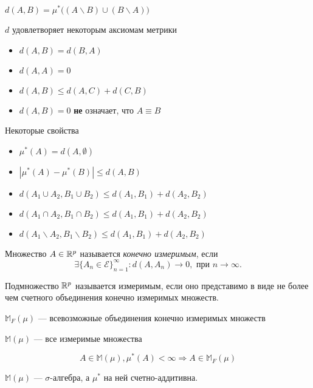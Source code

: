 \begin{definition}
  $d(A, B) = \mu^*\big((A\backslash B) \cup (B \backslash A)\big)$
\end{definition}

$d$ удовлетворяет некоторым аксиомам метрики

\begin{itemize}
  \item $d(A, B) = d(B, A)$
  \item $d(A, A) = 0$
  \item $d(A, B) \leq d(A, C) + d(C, B)$
  \item $d(A, B) = 0$ \textbf{не} означает, что $A \equiv B$
\end{itemize}

Некоторые свойства

\begin{itemize}
  \item $\mu^*(A) = d(A, \emptyset)$
  \item $|\mu^*(A) - \mu^*(B)| \leq d(A, B)$
  \item $d(A_1 \cup A_2, B_1 \cup B_2) \leq d(A_1, B_1) + d(A_2, B_2)$
  \item $d(A_1 \cap A_2, B_1 \cap B_2) \leq d(A_1, B_1) + d(A_2, B_2)$
  \item $d(A_1 \backslash A_2, B_1 \backslash B_2) \leq d(A_1, B_1) + d(A_2, B_2)$
\end{itemize}

\begin{definition}
  Множество $A \in \mathbb{R}^p$ называется \textit{конечно измеримым}, если $$\exists \{A_n \in \mathcal{E}\}_{n = 1}^{\infty}: d(A, A_n) \to 0, \text{ при } n \to \infty.$$
\end{definition}
\begin{definition}
  Подмножество $\mathbb{R}^p$ называется измеримым, если оно представимо в виде не более чем счетного объединения конечно измеримых множеств.
\end{definition}

$\mathbb{M}_F(\mu)$ --- всевозможные объединения конечно измеримых множеств

$\mathbb{M}(\mu)$ --- все измеримые множества

\begin{lemma}
  \hypertarget{Lemma1}{}
  $$A \in \mathbb{M}(\mu), \mu^*(A) < \infty  \Rightarrow A \in \mathbb{M}_F(\mu)$$
\end{lemma}

\begin{theorem}[Каратеодори]
  $\mathbb{M}(\mu)$ --- $\sigma$-алгебра, а $\mu^*$ на ней счетно-аддитивна.
\end{theorem}

